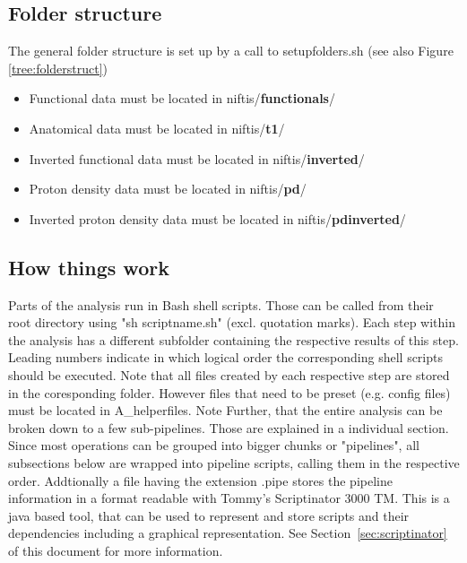 \documentclass[12pt,a4paper]{scrartcl}
\begin{document}
\subsection{Folder structure}
The general folder structure is set up by a call to setupfolders.sh (see also Figure \ref{tree:folderstruct})
\begin{itemize}
\item Functional data must be located in niftis/\textbf{functionals}/
\item Anatomical data must be located in niftis/\textbf{t1}/
\item Inverted functional data must be located in niftis/\textbf{inverted}/
\item Proton density data must be located in niftis/\textbf{pd}/
\item Inverted proton density data must be located in niftis/\textbf{pdinverted}/
\end{itemize}

\subsection{How things work}
Parts of the analysis run in Bash shell scripts. Those can be called from their root directory using "sh scriptname.sh" (excl. quotation marks). Each step within the analysis has a different subfolder containing the respective results of this step. Leading numbers indicate in which logical order the corresponding shell scripts should be executed. Note that all files created by each respective step are stored in the coresponding folder. However files that need to be preset (e.g. config files) must be located in A\_helperfiles. Note Further, that the entire analysis can be broken down to a few sub-pipelines. Those are explained in a individual section.\\

\noindent Since most operations can be grouped into bigger chunks or "pipelines", all subsections below are wrapped into pipeline scripts, calling them in the respective order. Addtionally a file having the extension .pipe stores the pipeline information in a format readable with Tommy's Scriptinator 3000 TM. This is a java based tool, that can be used to represent and store scripts and their dependencies including a graphical representation. See Section~\ref{sec:scriptinator} of this document for more information.
\end{document}
